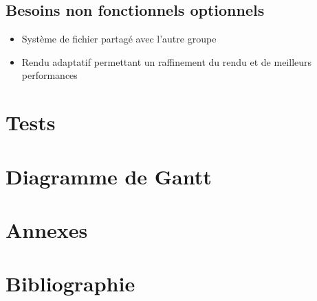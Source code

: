 \documentclass[a4paper]{article}
\begin{document}
\subsection{Besoins non fonctionnels optionnels}
\begin{itemize}
\item Système de fichier partagé avec l’autre groupe
\item Rendu adaptatif permettant un raffinement du rendu et de meilleurs performances

\end{itemize}

\section{Tests}

\section{Diagramme de Gantt}

\section{Annexes}


\section{Bibliographie}




\end{document}
